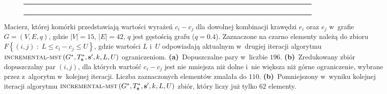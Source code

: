 \begin{figure}[!htbp]
\begin{subfigure}[b]{0.3\textwidth}
{\begin{tabu}{|c|c|c|c|c|c|c|c|c|c|c|c|c|c|c|c|c|c|c|c|c|c|c|c|c|c|c|c|c|c|c|c|c|c|c|c|c|c|c|c|c|c|}
				& & & & & & & & & & & & & & & & & & & & & & & & & & & & & & & & & & & & & & & & & \\\hline
				& & \cellcolor{black}	& & 	& & 	& & 	& & & & & & & & & & & & & \cellcolor{black}	& 	& & & 	& & 	& & & 	& & 	& 	& 	& & 	& & & & & 	\\\hline
				& & & & & & & & & & & & & & & & & & & & & & & & & & & & & & & & & & & & & & & & & \\\hline
				& & & & & & & & & & & & & & & & & & & & & & & & & & & & & & & & & & & & & & & & & \\\hline
				& & & & & & & & & & & & & & & & & & & & & & & & & & & & & & & & & & & & & & & & & \\\hline
			\end{tabu}%
		}
		\caption{}
		\label{fig:imstSeed2:c}
	\end{subfigure}
	\hfill\null
	\caption{
		Macierz, której komórki przedstawiają wartości wyrażeń $c_{i} - c_{j}$ dla dowolnej kombinacji krawędzi $e_{i}$ oraz $e_{j}$ w~grafie $G = \left( V, E, q \right)$, gdzie $\left| V \right| = 15$, $\left| E \right| = 42$, $q$ jest gęstością grafu ($q = 0.4$). Zaznaczone na czarno elementy należą do zbioru $F \left\{ \left( i, j \right) \; : \; L \leqslant c_{i} - c_{j} \leqslant U \right\}$, gdzie wartości $L$ i~$U$ odpowiadają aktualnym w~drugiej iteracji algorytmu $\textsc{incremental-mst} \left( G^{\ast}, T^{\ast}_{\textbf{s}}, \textbf{s}^{\prime}, k, L, U \right)$ ograniczeniom.
		\textbf{(a)}~Dopuszczalne pary  w~liczbie $196$.
		\textbf{(b)}~Zredukowany zbiór dopuszczalny par $\left( i, j \right)$, dla których wartość $c_{i} - c_{j}$ jest nie mniejsza niż dolne i~nie większa niż górne ograniczenie, wybrane przez z~algorytm w~kolejnej iteracji. Liczba zaznaczonych elementów zmalała do $110$.
		\textbf{(b)}~Pomniejszony w~wyniku kolejnej iteracji algorytmu $\textsc{incremental-mst} \left( G^{\ast}, T^{\ast}_{\textbf{s}}, \textbf{s}^{\prime}, k, L, U \right)$ zbiór, który liczy już tylko $62$ elementy.
	}
	\label{fig:imstSeed2}
\end{figure}

